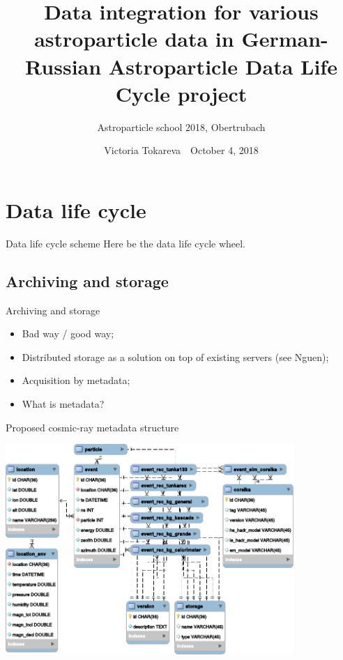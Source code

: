 \documentclass[18pt]{beamer}
\title[Cosmic rays data center based on KCDC]{Data integration for various astroparticle data in German-Russian Astroparticle Data Life Cycle project}
\subtitle{Astroparticle school 2018, Obertrubach}
\author[Victoria Tokareva]{
  Victoria Tokareva~\textbar~October 4, 2018
}
\institute{Institute for Nuclear Physics (IKP)}
\begin{document}



\section{Data life cycle}

\begin{frame}{Data life cycle scheme}
\Huge Here be the data life cycle wheel.
\end{frame}

\subsection{Archiving and storage}

\begin{frame}{Archiving and storage}
\begin{itemize}
\item Bad way / good way;
\item Distributed storage as a solution on top of existing servers (see Nguen);
\item Acquisition by metadata;
\item What is metadata?
\end{itemize}
\end{frame}

\begin{frame}{Proposed cosmic-ray metadata structure}
\vspace{-1.5em}
\begin{center}
\includegraphics[width=0.82\textwidth]{pics/metadata.pdf}
\end{center}
\end{frame}
\end{document}
